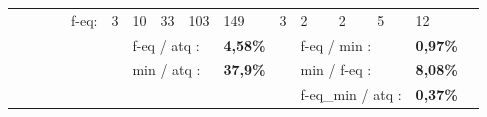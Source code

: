 \begin{table}[p]
\begin{center}
\begin{tabular}{llll|llllll|lllll|l}
                         & \multicolumn{3}{c|}{} & f-eq: & 3 & 10 & 33 & 103 & 149 & 3 & 2 & 2 & 5 & 12 &  \\
                         &  &  &  &  &  & \multicolumn{3}{l}{f-eq / atq :} & \multicolumn{1}{r|}{\textbf{4,58\%}} &  & \multicolumn{3}{l}{f-eq / min :} & \multicolumn{1}{r|}{\textbf{0,97\%}} &  \\
                         &  &  &  &  &  & \multicolumn{3}{l}{min / atq :} & \multicolumn{1}{r|}{\textbf{37,9\%}} &  & \multicolumn{3}{l}{min / f-eq :} & \multicolumn{1}{r|}{\textbf{8,08\%}} &  \\
                         &  &  &  &  &  &  &  &  &  &  & \multicolumn{3}{l}{f-eq\_min / atq :} & \multicolumn{1}{r|}{\textbf{0,37\%}} & 
                        \end{tabular}
                    \end{center}
                \end{table} 
            
